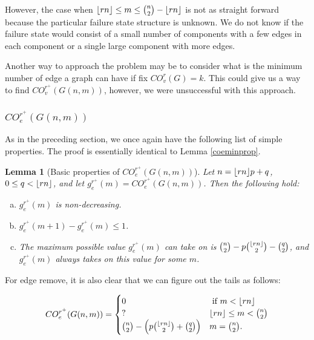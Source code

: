 \documentclass[12pt]{article}
\DeclarePairedDelimiter{\floor}{\lfloor}{\rfloor}
\newtheorem{lemma}[theorem]{Lemma}
\theoremstyle{definition}
\newcommand{\COV}[2]{CO^{#1}_{v}(#2)}
\newcommand{\COVMAX}[1]{CO^{r^+}_{v}(#1)}
\newcommand{\COEMAX}[1]{CO^{r^+}_{e}(#1)}
\newcommand{\geMAX}[1]{g_{e}^{r^+}(#1)}
\begin{document}
However, the case when $\floor{rn} \leq m \leq {n \choose 2} - \floor{rn}$ is not as straight forward because the particular failure state structure is unknown. We do not know if the failure state would consist of a small number of components with a few edges in each component or a single large component with more edges. 

Another way to approach the problem may be to consider what is the minimum number of edge a graph can have if fix $\COV{r}{G} = k$. This could give us a way to find $\COVMAX{G(n,m)}$, however, we were unsuccessful with this approach. 




\subsubsection{$\COEMAX{G(n,m)}$}

As in the preceding section, we once again have the following list of simple properties. The proof is essentially identical to Lemma \ref{coeminprop}.

\begin{lemma}[Basic properties of $\COEMAX{G(n,m)}$]
Let $n=\floor{rn}p+q$, $0\le q < \floor{rn}$, and let $\geMAX{m}=\COEMAX{G(n,m)}$. Then the following hold:
\begin{enumerate}[(a)]
  \item $\geMAX{m}$ is non-decreasing.
  \item $\geMAX{m+1}-\geMAX{m} \le 1$.
  \item The maximum possible value $\geMAX{m}$ can take on is ${n \choose 2}-p{\floor{rn} \choose 2} - {q \choose 2}$, and $\geMAX{m}$ always takes on this value for some $m$.
\end{enumerate}
\end{lemma}

For edge remove, it is also clear that we can figure out the tails as follows: 

$$\COEMAX{G(n,m)} = 
\begin{cases}
  0 & \text{ if } m < \floor{rn}\\
  ? & \floor{rn} \leq m < {n \choose 2}\\
  {n \choose 2} - \left(p {\floor{rn} \choose 2} + {q \choose 2}\right) & m={n \choose 2}. \\
\end{cases}
$$
\end{document}
